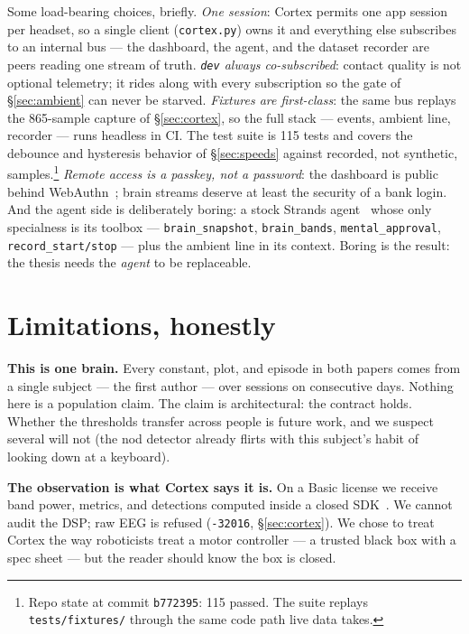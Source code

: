 \documentclass{article}
\begin{document}
Some load-bearing choices, briefly. \emph{One session}: Cortex permits one app session per headset, so a single client (\texttt{cortex.py}) owns it and everything else subscribes to an internal bus --- the dashboard, the agent, and the dataset recorder are peers reading one stream of truth. \emph{\texttt{dev} always co-subscribed}: contact quality is not optional telemetry; it rides along with every subscription so the gate of \S\ref{sec:ambient} can never be starved. \emph{Fixtures are first-class}: the same bus replays the 865-sample capture of \S\ref{sec:cortex}, so the full stack --- events, ambient line, recorder --- runs headless in CI. The test suite is 115 tests and covers the debounce and hysteresis behavior of \S\ref{sec:speeds} against recorded, not synthetic, samples.\footnote{Repo state at commit \texttt{b772395}: 115 passed. The suite replays \texttt{tests/fixtures/} through the same code path live data takes.} \emph{Remote access is a passkey, not a password}: the dashboard is public behind WebAuthn~\cite{webauthn2021}; brain streams deserve at least the security of a bank login. And the agent side is deliberately boring: a stock Strands agent~\cite{strands2025sdk} whose only specialness is its toolbox --- \texttt{brain\_snapshot}, \texttt{brain\_bands}, \texttt{mental\_approval}, \texttt{record\_start/stop} --- plus the ambient line in its context. Boring is the result: the thesis needs the \emph{agent} to be replaceable.

\section{Limitations, honestly}
\label{sec:limits}

\textbf{This is one brain.} Every constant, plot, and episode in both papers comes from a single subject --- the first author --- over sessions on consecutive days. Nothing here is a population claim. The claim is architectural: the contract holds. Whether the thresholds transfer across people is future work, and we suspect several will not (the nod detector already flirts with this subject's habit of looking down at a keyboard).

\textbf{The observation is what Cortex says it is.} On a Basic license we receive band power, metrics, and detections computed inside a closed SDK~\cite{emotiv2024cortex}. We cannot audit the DSP; raw EEG is refused (\texttt{-32016}, \S\ref{sec:cortex}). We chose to treat Cortex the way roboticists treat a motor controller --- a trusted black box with a spec sheet --- but the reader should know the box is closed.
\end{document}
